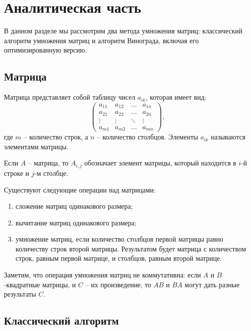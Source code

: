 \chapter{Аналитическая часть}
В данном разделе мы рассмотрим два метода умножения матриц: классический алгоритм умножения матриц и алгоритм Винограда, включая его оптимизированную версию.

\section{Матрица}

Матрица \cite{book_matrix} представляет собой таблицу чисел $a_{ik}$, которая имеет вид:
\begin{equation}
	\begin{pmatrix}
		a_{11} & a_{12} & \ldots & a_{1n}\\
		a_{21} & a_{22} & \ldots & a_{2n}\\
		\vdots & \vdots & \ddots & \vdots\\
		a_{m1} & a_{m2} & \ldots & a_{mn}
	\end{pmatrix},
\end{equation}
где $m$ -- количество строк, а $n$ -- количество столбцов. 
Элементы $a_{ik}$ называются элементами матрицы.

Если $A$ -- матрица, то $A_{i,j}$ обозначает элемент матрицы, который находится в $i$-й строке и $j$-м столбце.

Существуют следующие операции над матрицами:
\begin{enumerate}[label=\arabic*)]
\item сложение матриц одинакового размера;
\item вычитание матриц одинакового размера;
\item умножение матриц, если количество столбцов первой матрицы равно количеству строк второй матрицы. Результатом будет матрица с количеством строк, равным первой матрице, и столбцов, равным второй матрице.
\end{enumerate}

Заметим, что операция умножения матриц не коммутативна: если $A$ и $B$-квадратные матрицы, и $C$ -- их произведение, то $AB$ и $BA$ могут дать разные результаты $C$.

\clearpage

\section{Классический алгоритм}

